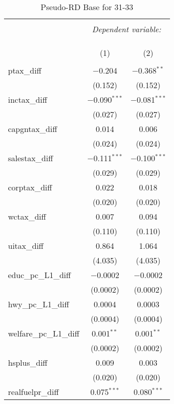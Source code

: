 
\begin{table}[!htbp] \centering 
  \caption{Pseudo-RD Base for  31-33} 
  \label{} 
\begin{tabular}{@{\extracolsep{5pt}}lcc} 
\\[-1.8ex]\hline 
\hline \\[-1.8ex] 
 & \multicolumn{2}{c}{\textit{Dependent variable:}} \\ 
\cline{2-3} 
\\[-1.8ex] & \multicolumn{2}{c}{ } \\ 
\\[-1.8ex] & (1) & (2)\\ 
\hline \\[-1.8ex] 
 ptax\_diff & $-$0.204 & $-$0.368$^{**}$ \\ 
  & (0.152) & (0.152) \\ 
  inctax\_diff & $-$0.090$^{***}$ & $-$0.081$^{***}$ \\ 
  & (0.027) & (0.027) \\ 
  capgntax\_diff & 0.014 & 0.006 \\ 
  & (0.024) & (0.024) \\ 
  salestax\_diff & $-$0.111$^{***}$ & $-$0.100$^{***}$ \\ 
  & (0.029) & (0.029) \\ 
  corptax\_diff & 0.022 & 0.018 \\ 
  & (0.020) & (0.020) \\ 
  wctax\_diff & 0.007 & 0.094 \\ 
  & (0.110) & (0.110) \\ 
  uitax\_diff & 0.864 & 1.064 \\ 
  & (4.035) & (4.035) \\ 
  educ\_pc\_L1\_diff & $-$0.0002 & $-$0.0002 \\ 
  & (0.0002) & (0.0002) \\ 
  hwy\_pc\_L1\_diff & 0.0004 & 0.0003 \\ 
  & (0.0004) & (0.0004) \\ 
  welfare\_pc\_L1\_diff & 0.001$^{**}$ & 0.001$^{**}$ \\ 
  & (0.0002) & (0.0002) \\ 
  hsplus\_diff & 0.009 & 0.003 \\ 
  & (0.020) & (0.020) \\ 
  realfuelpr\_diff & 0.075$^{***}$ & 0.080$^{***}$ \\ 

\end{tabular}
\end{table}
